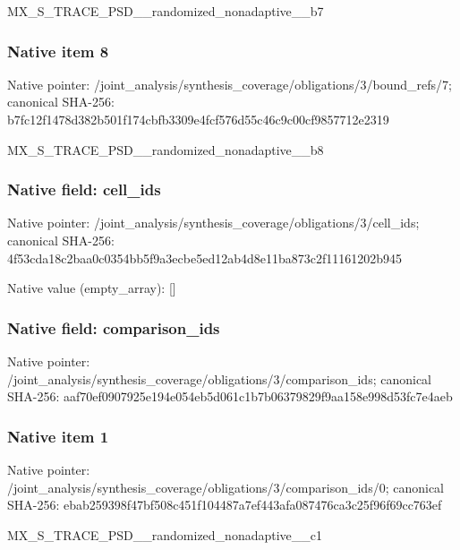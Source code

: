 \documentclass[10pt,a4paper]{article}
\begin{document}
\begingroup\raggedright\sloppy MX\_\allowbreak{}S\_\allowbreak{}TRACE\_\allowbreak{}PSD\_\allowbreak{}\_\allowbreak{}randomized\_\allowbreak{}nonadaptive\_\allowbreak{}\_\allowbreak{}b7\par\endgroup

\subsubsection{Native item 8}
Native pointer: /joint\_\allowbreak{}analysis/synthesis\_\allowbreak{}coverage/obligations/3/bound\_\allowbreak{}refs/7; canonical SHA-256: b7fc12f1478d382b501f174cbfb3309e4fcf576d55c46c9c00cf9857712e2319

\begingroup\raggedright\sloppy MX\_\allowbreak{}S\_\allowbreak{}TRACE\_\allowbreak{}PSD\_\allowbreak{}\_\allowbreak{}randomized\_\allowbreak{}nonadaptive\_\allowbreak{}\_\allowbreak{}b8\par\endgroup

\subsubsection{Native field: cell\_\allowbreak{}ids}
Native pointer: /joint\_\allowbreak{}analysis/synthesis\_\allowbreak{}coverage/obligations/3/cell\_\allowbreak{}ids; canonical SHA-256: 4f53cda18c2baa0c0354bb5f9a3ecbe5ed12ab4d8e11ba873c2f11161202b945

Native value (empty\_\allowbreak{}array): []

\subsubsection{Native field: comparison\_\allowbreak{}ids}
Native pointer: /joint\_\allowbreak{}analysis/synthesis\_\allowbreak{}coverage/obligations/3/comparison\_\allowbreak{}ids; canonical SHA-256: aaf70ef0907925e194e054eb5d061c1b7b06379829f9aa158e998d53fc7e4aeb

\subsubsection{Native item 1}
Native pointer: /joint\_\allowbreak{}analysis/synthesis\_\allowbreak{}coverage/obligations/3/comparison\_\allowbreak{}ids/0; canonical SHA-256: ebab259398f47bf508c451f104487a7ef443afa087476ca3c25f96f69cc763ef

\begingroup\raggedright\sloppy MX\_\allowbreak{}S\_\allowbreak{}TRACE\_\allowbreak{}PSD\_\allowbreak{}\_\allowbreak{}randomized\_\allowbreak{}nonadaptive\_\allowbreak{}\_\allowbreak{}c1\par\endgroup
\end{document}
